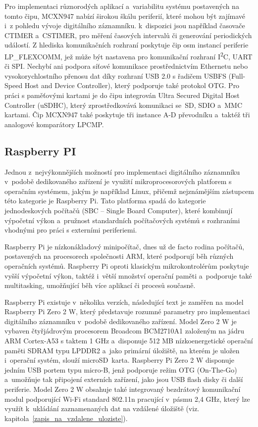 Pro implementaci různorodých aplikací a~variabilitu systému postavených na tomto čipu, MCXN947 nabízí širokou škálu periferií, které mohou být zajímavé i~z pohledu vývoje digitálního záznamníku. k~dispozici jsou například časovače CTIMER a~CSTIMER, pro měření časových intervalů či generování periodických událostí. Z hlediska komunikačních rozhraní poskytuje čip osm instancí periferie LP\_FLEXCOMM, jež může být nastavena pro komunikační rozhraní I\textsuperscript{2}C, UART či SPI. Nechybí ani podpora síťové komunikace prostřednictvím Ethernetu nebo vysokorychlostního přenosu dat díky rozhraní USB 2.0 s řadičem USBFS (Full-Speed Host and Device Controller), který podporuje také protokol OTG. Pro práci s paměťovými kartami je do čipu integrován Ultra Secured Digital Host Controller (uSDHC), který zprostředkovává komunikaci se~SD, SDIO a~MMC kartami. Čip MCXN947 také poskytuje tři instance A-D převodníku a~taktéž tři analogové komparátory LPCMP.~\cite{nxp_MCX_Nx4x_Reference_Manual}

\subsection{Raspberry PI}
Jednou z~nejvýkonnějších možností pro implementaci digitálního záznamníku v~podobě dedikovaného zařízení je využití mikroprocesorových platforem s operačním systémem, jakým je například Linux, přičemž nejznámějším zástupcem této kategorie je Raspberry Pi. Tato platforma spadá do kategorie jednodeskových počítačů (SBC -- Single Board Computer), které kombinují výpočetní výkon a~pružnost standardních počítačových systémů s rozhraními vhodnými pro práci s externími periferiemi.~\cite{raspberry_pi_pico_2w}

Raspberry Pi je nízkonákladový minipočítač, dnes už de facto rodina počítačů, postavených na procesorech společnosti ARM, které podporují běh různých operačních systémů. Raspberry Pi oproti klasickým mikrokontrolérům poskytuje vyšší výpočetní výkon, taktéž i~větší množství operační paměti a~podporuje také multitasking, umožňující běh více aplikací či procesů současně.~\cite{raspberry_pi_pico_2w}

Raspberry Pi existuje v~několika verzích, následující text je zaměřen na model Raspberry Pi Zero 2 W, který představuje rozumné parametry pro implementaci digitálního záznamníku v~podobě dedikovaného zařízení. Model Zero 2 W je vybaven čtyřjádrovým procesorem Broadcom BCM2710A1 založeným na jádru ARM Cortex-A53 s taktem 1 GHz a~disponuje 512 MB nízkoenergetické operační paměti SDRAM typu LPDDR2 a~jako primární úložiště, na kterém je uložen i~operační systém, slouží microSD~karta. Raspberry Pi Zero 2 W disponuje jedním USB portem typu micro-B, jenž podporuje režim OTG (On-The-Go) a~umožňuje tak připojení externích zařízení, jako jsou USB flash disky či další periferie. Model Zero 2 W obsahuje také integrovaný bezdrátový komunikační modul podporující Wi-Fi standard 802.11n pracující v~pásmu 2,4 GHz, který lze využít k~ukládání zaznamenaných dat na vzdálené úložiště (viz. kapitola~\ref{zapis_na_vzdalene_uloziste}).~\cite{raspberry_pi_pico_2w}

